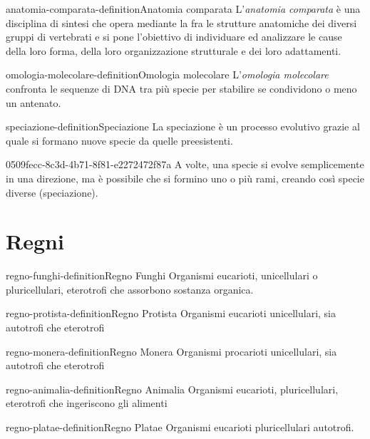 \documentclass[preview]{standalone}
\begin{document}
\begin{snippetdefinition}{anatomia-comparata-definition}{Anatomia comparata}
    L'\textit{anatomia comparata} è una disciplina di sintesi che 
    opera mediante la  fra le strutture anatomiche
    dei diversi gruppi di vertebrati e si pone l'obiettivo di individuare ed analizzare
    le cause della loro forma, della loro organizzazione strutturale e dei loro adattamenti.
\end{snippetdefinition}

\begin{snippetdefinition}{omologia-molecolare-definition}{Omologia molecolare}
    L'\textit{omologia molecolare} confronta le sequenze di DNA
    tra più specie per stabilire se condividono o meno un antenato.
\end{snippetdefinition}


\begin{snippetdefinition}{speciazione-definition}{Speciazione}
    La speciazione è un processo evolutivo grazie al quale si formano nuove specie da quelle preesistenti. 
\end{snippetdefinition}

\begin{snippet}{0509fecc-8c3d-4b71-8f81-e2272472f87a}
    A volte, una specie si evolve semplicemente in una direzione, ma è possibile che si formino
    uno o più rami, creando così specie diverse (speciazione).
\end{snippet}


\section{Regni}

\begin{snippetdefinition}{regno-funghi-definition}{Regno Funghi}
    Organismi eucarioti, unicellulari o pluricellulari, eterotrofi
    che assorbono sostanza organica.
\end{snippetdefinition}

\begin{snippetdefinition}{regno-protista-definition}{Regno Protista}
    Organismi eucarioti unicellulari, sia autotrofi
    che eterotrofi
\end{snippetdefinition}

\begin{snippetdefinition}{regno-monera-definition}{Regno Monera}
    Organismi procarioti
    unicellulari, sia autotrofi che eterotrofi
\end{snippetdefinition}

\begin{snippetdefinition}{regno-animalia-definition}{Regno Animalia}
    Organismi eucarioti, pluricellulari, eterotrofi
    che ingeriscono gli alimenti
\end{snippetdefinition}

\begin{snippetdefinition}{regno-platae-definition}{Regno Platae}
    Organismi eucarioti pluricellulari autotrofi.
\end{snippetdefinition}
\end{document}
